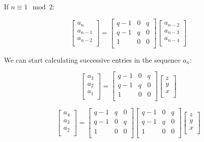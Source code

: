 \documentclass[paper.tex]{subfiles}
\begin{document}
If $n \equiv 1 \mod 2$:

\[ 
\left[ \begin{array}{ccc}
a_{n} \\
a_{n-1} \\
a_{n-2} \\
\end{array} \right] 
=
\left[ \begin{array}{ccc}
q-1 & 0 & q \\
q-1 & q & 0 \\
1 & 0 & 0 \\
\end{array} \right]
\left[ \begin{array}{ccc}
a_{n-2} \\
a_{n-3} \\
a_{n-4} \\
\end{array} \right] 
\] 


We can start calculating successive entries in the sequence {$a_{n}$}:

\[ 
\left[ \begin{array}{ccc}
a_{3} \\
a_{2} \\
a_{1} \\
\end{array} \right] 
=
\left[ \begin{array}{ccc}
q-1 & 0 & q \\
q-1 & q & 0 \\
1 & 0 & 0 \\
\end{array} \right]
\left[ \begin{array}{ccc}
z \\
y \\
x \\
\end{array} \right] 
\] 

\[ 
\left[ \begin{array}{ccc}
a_{4} \\
a_{3} \\
a_{2} \\
\end{array} \right] 
=
\left[ \begin{array}{ccc}
q-1 & q & 0 \\
q-1 & 0 & q \\
1 & 0 & 0 \\
\end{array} \right]
\left[ \begin{array}{ccc}
q-1 & 0 & q \\
q-1 & q & 0 \\
1 & 0 & 0 \\
\end{array} \right]
\left[ \begin{array}{ccc}
z \\
y \\
x \\
\end{array} \right] 
\] 
\end{document}
